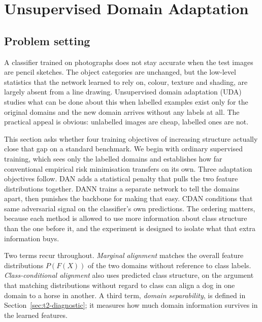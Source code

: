 
\section{Unsupervised Domain Adaptation}
\label{sec:task2}

\subsection{Problem setting}

A classifier trained on photographs does not stay accurate when the test images
are pencil sketches. The object categories are unchanged, but the low-level
statistics that the network learned to rely on, colour, texture and shading, are
largely absent from a line drawing. Unsupervised domain adaptation (UDA) studies
what can be done about this when labelled examples exist only for the original
domains and the new domain arrives without any labels at all. The practical
appeal is obvious: unlabelled images are cheap, labelled ones are not.

This section asks whether four training objectives of increasing structure
actually close that gap on a standard benchmark. We begin with ordinary
supervised training, which sees only the labelled domains and establishes how far
conventional empirical risk minimisation transfers on its own. Three adaptation
objectives follow. DAN adds a statistical penalty that pulls the two feature
distributions together. DANN trains a separate network to tell the domains apart,
then punishes the backbone for making that easy. CDAN conditions that same
adversarial signal on the classifier's own predictions. The ordering
matters, because each method is allowed to use more information about class
structure than the one before it, and the experiment is designed to isolate what
that extra information buys.

Two terms recur throughout. \emph{Marginal alignment} matches the overall feature
distributions $P(F(X))$ of the two domains without reference to class labels.
\emph{Class-conditional alignment} also uses predicted class structure, on
the argument that matching distributions without regard to class can align a dog
in one domain to a horse in another. A third term, \emph{domain separability},
is defined in Section~\ref{sec:t2-diagnostic}; it measures how much domain
information survives in the learned features.

